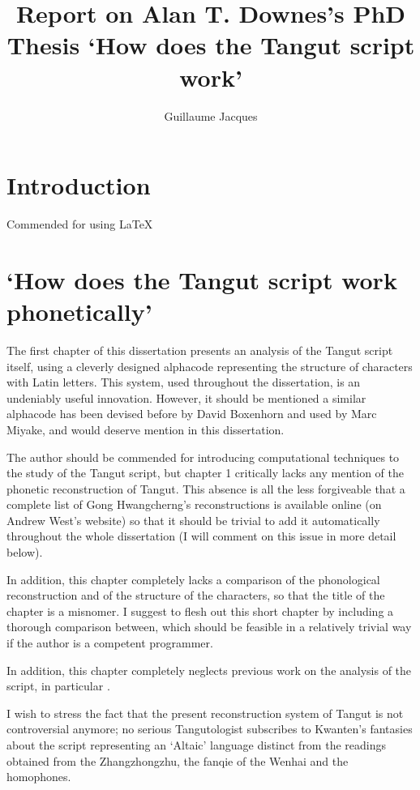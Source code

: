 \documentclass[oneside,a4paper,11pt]{article}
\begin{document}
 

\title{Report on Alan T. Downes's PhD Thesis `How does the Tangut script work'}
\author{Guillaume Jacques}
\maketitle

\section*{Introduction}
Commended for using \LaTeX


\section{`How does the Tangut script work phonetically'}
The first chapter of this dissertation presents an analysis of the Tangut script itself, using a cleverly designed alphacode representing the structure of characters with Latin letters. This system, used throughout the dissertation, is an undeniably useful innovation. However, it should be mentioned a similar alphacode has been devised before by David Boxenhorn and used by Marc Miyake, and would deserve mention in this dissertation.

The author should be commended for introducing computational techniques to the study of the Tangut script, but chapter 1 critically lacks any mention of the phonetic reconstruction of Tangut. This absence is all the less forgiveable that a complete list of Gong Hwangcherng's reconstructions  is available online (on Andrew West's website) so that it should be trivial to add it automatically throughout the whole dissertation (I will comment on this issue in more detail below).

In addition, this chapter completely lacks a comparison of the phonological reconstruction and of the structure of the characters, so that the title of the chapter is a misnomer. I suggest to flesh out this short chapter by including a thorough comparison between, which should be feasible in a relatively trivial way if the author is a competent programmer.

In addition, this chapter completely neglects previous work on the analysis of the script, in particular \citet{gong84}. 

I wish to stress the fact that the present reconstruction system of Tangut is not controversial anymore; no serious Tangutologist subscribes to Kwanten's fantasies about the script representing an `Altaic' language distinct from the readings obtained from the Zhangzhongzhu, the fanqie of the Wenhai and the homophones.
\end{document}
